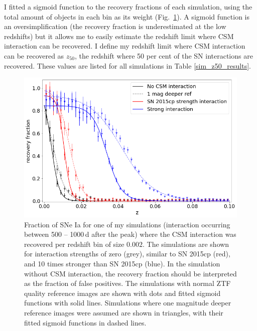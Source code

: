\documentclass[a4paper,oneside,12pt, class=Latex/Classes/PhDthesisPSnPDF, crop=false]{standalone}
\begin{document}
I fitted a sigmoid function to the recovery fractions of each simulation, using the total amount of objects in each bin as its weight (Fig.~\ref{recov_fracs}). A sigmoid function is an oversimplification (the recovery fraction is underestimated at the low redshifts) but it allows me to easily estimate the redshift limit where CSM interaction can be recovered. I define my redshift limit where CSM interaction can be recovered as $z_{50}$, the redshift where 50 per cent of the SN interactions are recovered. These values are listed for all simulations in Table \ref{sim_z50_results}.


\begin{figure}
 \centering
 \includegraphics[width=\textwidth]{../Images/chapter_3/recov_fracs.png}
 \caption{Fraction of SNe Ia for one of my simulations (interaction occurring between 500 -- 1000\,d after the peak) where the CSM interaction was recovered per redshift bin of size $0.002$. The simulations are shown for interaction strengths of zero (grey), similar to SN 2015cp (red), and 10 times stronger than SN 2015cp (blue). In the simulation without CSM interaction, the recovery fraction should be interpreted as the fraction of false positives. The simulations with normal ZTF quality reference images are shown with dots and fitted sigmoid functions with solid lines. Simulations where one magnitude deeper reference images were assumed are shown in triangles, with their fitted sigmoid functions in dashed lines.}
 \label{recov_fracs}
\end{figure}
\end{document}
